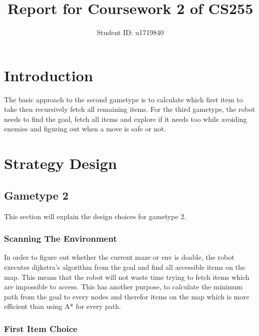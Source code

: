 \documentclass{cs255}
\begin{document}
\title{Report for Coursework 2 of CS255}


\author{Student ID: u1719840}

\maketitle



\section{Introduction}
The basic approach to the second gametype is to calculate which first item to take then recursively fetch all remaining items.
For the third gametype, the robot needs to find the goal, fetch all items and explore if it needs too while avoiding enemies and figuring out when a move is safe or not.

\section{Strategy Design}

\subsection{Gametype 2}

This section will explain the design choices for gametype 2.

\subsubsection{Scanning The Environment}

In order to figure out whether the current maze or env is doable, the robot executes dijkstra's algorithm from the goal
and find all accessible items on the map. This means that the robot will not waste time trying to fetch items which are impossible to access.
This has another purpose, to calculate the minimum path from the goal to every nodes and therefor items on the map which is more efficient than using A* for every path.

\subsubsection{First Item Choice}
\end{document}
